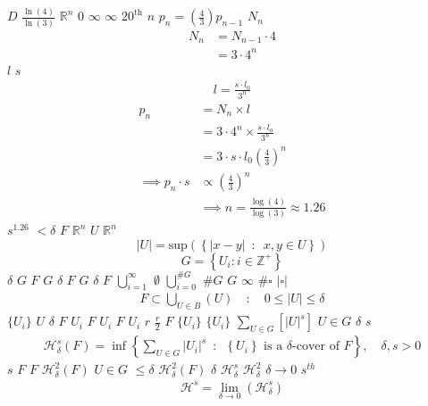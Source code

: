 \documentclass{article}
\begin{document}
$D$
$\frac{\ln\left( 4 \right)}{\ln\left( 3
\right)}$
$\mathbb{R}^{n}$
$0$
$\infty$
$\infty$
$20^{\mathrm{th}}$
$n$
$p_{n}= \left(\frac{4}{3}
\right)p_{n-1}$
$N_{n}$
\begin{align}
N_{n} &= N_{n-1} \cdot 4 \\
&= 3 \cdot 4^{n}
\end{align}
$l$
$s$
\begin{align}
l = \frac{s \cdot l_{0}}{3^{n}}
\end{align}
\begin{align}
p_{n} &= N_{n} \times l \\
&= 3\cdot 4^{n} \times \frac{s \cdot l_{o}}{3^{n}} \\
&= 3 \cdot s \cdot  l_{0} \left( \frac{4}{3} \right)^{n}\\
 \implies p_{n} \cdot s & \propto \left(\frac{4}{3}\right)^{n}\\
& \implies  n = \frac{\log\left( 4 \right)}{\log\left( 3 \right)} \approx 1.26 \label{eq:koch-dim}
\end{align}
$s^{1.26}$
$< \delta $
$F$
$\mathbb{R}^n$
$U$
$\mathbb{R}^{n}$
\[
\left\lvert U \right\rvert = \mathrm{sup}\left(\left\{ \left\lvert x- y \right\rvert \enspace : \enspace x,y \in U\right\}  \right)
\]
\[
G = \left\{U_i: i \in \mathbb{Z}^{+}\right\}
\]
$\delta$
$G$
$F$
$G$
$\delta$
$F$
$G$
$\delta$
$F$
$\bigcup_{i=1}^{\infty}$
$\emptyset$
$\bigcup^{\#G}_{i=0}$
$\#G$
$G$
$\infty$
$\#\square$
$\left\lvert \square \right\rvert $
\begin{align}
    F \subset \bigcup_{U\in B} \left( U \right) \quad :\quad 0 \leq \left\lvert U \right\rvert \leq \delta \label{eq:hausdorff-covering}
\end{align}
$\{U_{i}\}$
$U$
$\delta$
$F$
$U_{i}$
$F$
$U_{i}$
$F$
$U_{i}$
$r$
$\frac{r}{2}$
$F$
$\{U_{i}\}$
$\{U_{i}\}$
$\sum_{U \in G} \left[\left\lvert U\right\rvert^{s}\right]$
$U\in G$
$\delta$
$s$
\begin{align}
\mathcal{H}^s_{\delta}\left( F \right)= \inf \left\{ \sum_{U\in G}   \left\lvert U_i \right\rvert^s \enspace : \enspace  \left\{U_i\right\} \text{ is a } \delta \text{-cover of } F \right\}, \quad \delta, s > 0 \label{eq:delta-measure}
\end{align}
$s$
$F$
$F$
$\mathcal{H}_{\delta}^{2}\left(F\right)$
$U\in G$
$\leq \delta$
$\mathcal{H}^{2}_{\delta} \left(F\right)$
$\delta$
$\mathcal{H}_{\delta}^{s}$
$\mathcal{H}^{2}_{\delta}$
$\delta \rightarrow 0$
$s^{th}$
\begin{align}
\mathcal{H}^{s} = \lim_{\delta \rightarrow 0}\left( \mathcal{H}^{s}_{\delta} \right) \label{eq:limit-haus}
\end{align}
\end{document}
